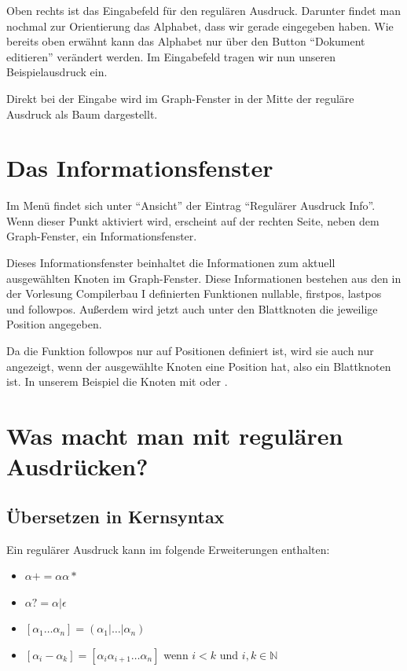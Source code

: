 Oben rechts ist das Eingabefeld für den regulären Ausdruck. Darunter findet man nochmal zur Orientierung das Alphabet, dass wir gerade eingegeben haben. Wie bereits oben erwähnt kann das Alphabet nur über den Button "`Dokument editieren"' verändert werden. Im Eingabefeld tragen wir nun unseren Beispielausdruck  ein.\vspace{10pt}

Direkt bei der Eingabe wird im Graph-Fenster in der Mitte der reguläre Ausdruck als Baum dargestellt.

\section{Das Informationsfenster}

Im Menü findet sich unter "`Ansicht"' der Eintrag "`Regulärer Ausdruck Info"'. Wenn dieser Punkt aktiviert wird, erscheint auf der rechten Seite, neben dem Graph-Fenster, ein Informationsfenster.

Dieses Informationsfenster beinhaltet die Informationen zum aktuell ausgewählten Knoten im Graph-Fenster. Diese Informationen bestehen aus den in der Vorlesung Compilerbau I definierten Funktionen nullable, firstpos, lastpos und followpos. Außerdem wird jetzt auch unter den Blattknoten die jeweilige Position angegeben.

Da die Funktion followpos nur auf Positionen definiert ist, wird sie auch nur angezeigt, wenn der ausgewählte Knoten eine Position hat, also ein Blattknoten ist. In unserem Beispiel die Knoten mit  oder .

\section{Was macht man mit regulären Ausdrücken?}

\subsection{Übersetzen in Kernsyntax}

Ein regulärer Ausdruck kann im \gtitool folgende Erweiterungen enthalten:

\begin{itemize}
  \item $\alpha+ = \alpha \alpha*$
  \item $\alpha? = \alpha|\epsilon$
  \item $[\alpha _1\ldots\alpha _n] = (\alpha _1|\ldots|\alpha _n)$
  \item $[\alpha _i - \alpha _k] = [\alpha _i \alpha _{i+1}\ldots\alpha _n]$ wenn $i < k$ und $i,k\in{\mathbb N}$
\end{itemize}

